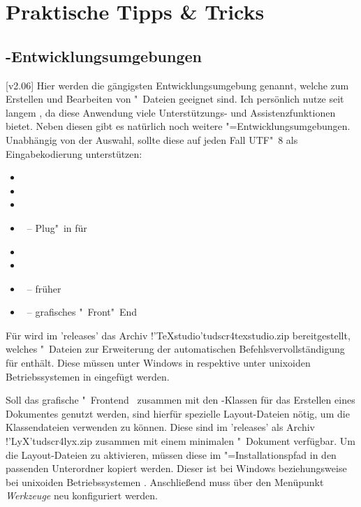 \chapter{%
  Praktische Tipps \& Tricks%
  \label{sec:tips}%
}
\section{%
  -Entwicklungsumgebungen%
  \label{sec:tips:ide}%
}

[v2.06]%
Hier werden die gängigsten Entwicklungsumgebung genannt, welche zum Erstellen 
und Bearbeiten von "~Dateien geeignet sind. Ich persönlich 
nutze seit langem , da diese Anwendung viele 
Unterstützungs- und Assistenzfunktionen bietet. Neben diesen gibt es natürlich 
noch weitere "=Entwicklungsumgebungen. Unabhängig von der 
Auswahl, sollte diese auf jeden Fall UTF"~8 als Eingabekodierung unterstützen:
%
\begin{itemize}
\item {}
\item {}
\item {}
\item {}~-- Plug"~in für 
\item {}
\item {}
\item {}~-- früher 
\item {}~-- grafisches "~Front"~End
\end{itemize}
%
Für  wird im \GitHubRepo'releases' das 
Archiv \GitHubFile!'TeXstudio'{tudscr4texstudio.zip} 
bereitgestellt, welches "~Dateien zur Erweiterung der automatischen 
Befehlsvervollständigung für \TUDScript enthält. Diese müssen unter Windows in 
 respektive unter unixoiden Betriebssystemen in 
 eingefügt werden.

Soll das grafische "~Frontend~ 
zusammen mit den \TUDScript-Klassen für das Erstellen eines Dokumentes genutzt 
werden, sind hierfür spezielle Layout-Dateien nötig, um die Klassendateien 
verwenden zu können. Diese sind im \GitHubRepo'releases' als Archiv 
\GitHubFile!'LyX'{tudscr4lyx.zip} zusammen mit einem minimalen 
"~Dokument verfügbar. Um die Layout-Dateien zu 
aktivieren, müssen diese im "=Installationspfad in 
den passenden Unterordner kopiert werden. Dieser ist bei Windows 
beziehungsweise bei unixoiden Betriebssystemen . 
Anschließend muss  über den Menüpunkt 
\emph{Werkzeuge} neu konfiguriert werden.



